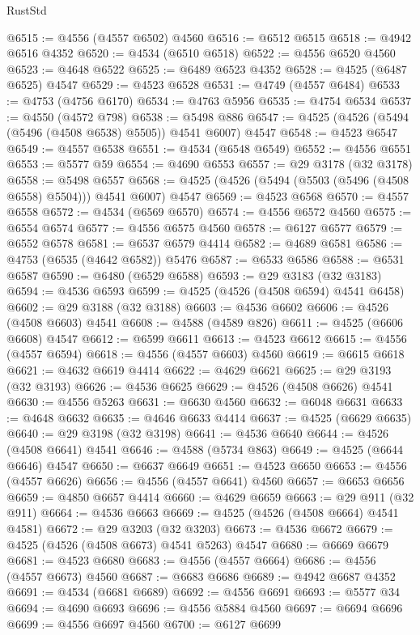 \begin{lexlean}{RustStd}
\begin{coremodule}
@6515 := @4556 (@4557 @6502) @4560
@6516 := @6512 @6515
@6518 := @4942 @6516 @4352
@6520 := @4534 (@6510 @6518)
@6522 := @4556 @6520 @4560
@6523 := @4648 @6522
@6525 := @6489 @6523 @4352
@6528 := @4525 (@6487 @6525) @4547
@6529 := @4523 @6528
@6531 := @4749 (@4557 @6484)
@6533 := @4753 (@4756 @6170)
@6534 := @4763 @5956
@6535 := @4754 @6534
@6537 := @4550 (@4572 @798)
@6538 := @5498 @886
@6547 := @4525 (@4526 (@5494 (@5496 (@4508 @6538) @5505)) @4541 @6007) @4547
@6548 := @4523 @6547
@6549 := @4557 @6538
@6551 := @4534 (@6548 @6549)
@6552 := @4556 @6551
@6553 := @5577 @59
@6554 := @4690 @6553
@6557 := @29 @3178 (@32 @3178)
@6558 := @5498 @6557
@6568 := @4525 (@4526 (@5494 (@5503 (@5496 (@4508 @6558) @5504))) @4541 @6007) @4547
@6569 := @4523 @6568
@6570 := @4557 @6558
@6572 := @4534 (@6569 @6570)
@6574 := @4556 @6572 @4560
@6575 := @6554 @6574
@6577 := @4556 @6575 @4560
@6578 := @6127 @6577
@6579 := @6552 @6578
@6581 := @6537 @6579 @4414
@6582 := @4689 @6581
@6586 := @4753 (@6535 (@4642 @6582)) @5476
@6587 := @6533 @6586
@6588 := @6531 @6587
@6590 := @6480 (@6529 @6588)
@6593 := @29 @3183 (@32 @3183)
@6594 := @4536 @6593
@6599 := @4525 (@4526 (@4508 @6594) @4541 @6458)
@6602 := @29 @3188 (@32 @3188)
@6603 := @4536 @6602
@6606 := @4526 (@4508 @6603) @4541
@6608 := @4588 (@4589 @826)
@6611 := @4525 (@6606 @6608) @4547
@6612 := @6599 @6611
@6613 := @4523 @6612
@6615 := @4556 (@4557 @6594)
@6618 := @4556 (@4557 @6603) @4560
@6619 := @6615 @6618
@6621 := @4632 @6619 @4414
@6622 := @4629 @6621
@6625 := @29 @3193 (@32 @3193)
@6626 := @4536 @6625
@6629 := @4526 (@4508 @6626) @4541
@6630 := @4556 @5263
@6631 := @6630 @4560
@6632 := @6048 @6631
@6633 := @4648 @6632
@6635 := @4646 @6633 @4414
@6637 := @4525 (@6629 @6635)
@6640 := @29 @3198 (@32 @3198)
@6641 := @4536 @6640
@6644 := @4526 (@4508 @6641) @4541
@6646 := @4588 (@5734 @863)
@6649 := @4525 (@6644 @6646) @4547
@6650 := @6637 @6649
@6651 := @4523 @6650
@6653 := @4556 (@4557 @6626)
@6656 := @4556 (@4557 @6641) @4560
@6657 := @6653 @6656
@6659 := @4850 @6657 @4414
@6660 := @4629 @6659
@6663 := @29 @911 (@32 @911)
@6664 := @4536 @6663
@6669 := @4525 (@4526 (@4508 @6664) @4541 @4581)
@6672 := @29 @3203 (@32 @3203)
@6673 := @4536 @6672
@6679 := @4525 (@4526 (@4508 @6673) @4541 @5263) @4547
@6680 := @6669 @6679
@6681 := @4523 @6680
@6683 := @4556 (@4557 @6664)
@6686 := @4556 (@4557 @6673) @4560
@6687 := @6683 @6686
@6689 := @4942 @6687 @4352
@6691 := @4534 (@6681 @6689)
@6692 := @4556 @6691
@6693 := @5577 @34
@6694 := @4690 @6693
@6696 := @4556 @5884 @4560
@6697 := @6694 @6696
@6699 := @4556 @6697 @4560
@6700 := @6127 @6699

\end{coremodule}
\end{lexlean}
